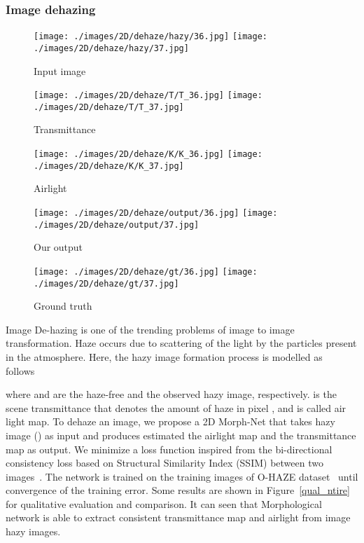 \documentclass[12pt]{article}
\def\Figref#1{Figure~\ref{#1}}
\begin{document}
\subsubsection{Image dehazing}
\begin{figure*}
\begin{subfigure}[t]{0.19\textwidth}
\texttt{[image: ./images/2D/dehaze/hazy/36.jpg]}
\texttt{[image: ./images/2D/dehaze/hazy/37.jpg]}
\caption{Input image}
\end{subfigure}
\begin{subfigure}[t]{0.19\textwidth}
\texttt{[image: ./images/2D/dehaze/T/T\_36.jpg]}
\texttt{[image: ./images/2D/dehaze/T/T\_37.jpg]}
\caption{Transmittance}
\end{subfigure}
\begin{subfigure}[t]{0.19\textwidth}
\texttt{[image: ./images/2D/dehaze/K/K\_36.jpg]}
\texttt{[image: ./images/2D/dehaze/K/K\_37.jpg]}
\caption{Airlight}
\end{subfigure}
\begin{subfigure}[t]{0.19\textwidth}
\texttt{[image: ./images/2D/dehaze/output/36.jpg]}
\texttt{[image: ./images/2D/dehaze/output/37.jpg]}
\caption{Our output}
\end{subfigure}
\begin{subfigure}[t]{0.19\textwidth}
\texttt{[image: ./images/2D/dehaze/gt/36.jpg]}
\texttt{[image: ./images/2D/dehaze/gt/37.jpg]}
\caption{Ground truth}
\end{subfigure}
\caption{Results of our 2D Morph-Net on three validation image of the O-HAZE dataset. Transmittance and airlight map is shown along with ground truth for comparison.}
\label{qual_ntire}
\end{figure*}


Image De-hazing is one of the trending problems of image to image transformation. Haze occurs due to scattering of the light by the particles present in the atmosphere. Here, the hazy image formation process is modelled as follows~\cite{mondal2018image} 

where  and  are the haze-free and the observed hazy image, respectively.  is the scene transmittance that denotes the amount of haze in pixel , and  is called air light map. 
To dehaze an image, we propose a 2D Morph-Net that takes hazy image () as input and produces estimated the airlight map  and the transmittance map  as output. We minimize a loss function inspired from the bi-directional consistency loss \cite{mondal2018image} based on Structural Similarity Index (SSIM) between two images~\cite{wang2004image}. The network is trained on the training images of O-HAZE dataset~\cite{ancuti2018haze} until convergence of the training error. Some results are shown in \Figref{qual_ntire} for qualitative evaluation and comparison. It can seen that Morphological network is able to extract consistent transmittance map and airlight from image hazy images. 
\end{document}
